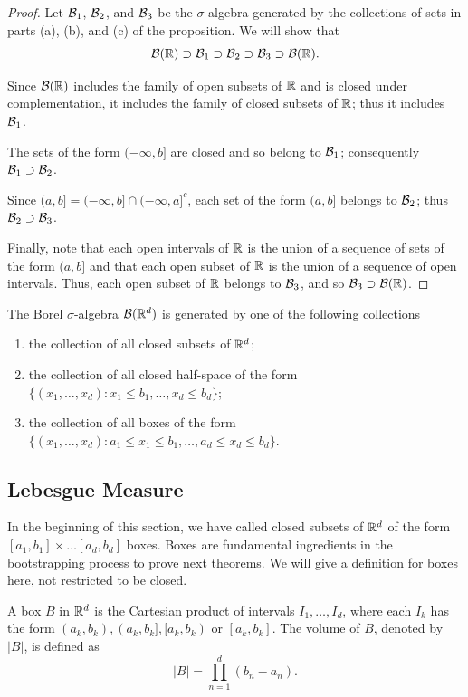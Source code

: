 \begin{proof}
  Let $\mathcal{B}_1$, $\mathcal{B}_2$, and $\mathcal{B}_3$ be the $\sigma$-algebra generated by the collections of sets in parts (a), (b), and (c) of the proposition. We will show that
  $$\mathcal{B}(\mathbb{R})\supset \mathcal{B}_1 \supset \mathcal{B}_2 \supset \mathcal{B}_3 \supset \mathcal{B}(\mathbb{R}).$$

  Since $\mathcal{B}(\mathbb{R})$ includes the family of open subsets of $\mathbb{R}$ and is closed under complementation, it includes the family of closed subsets of $\mathbb{R}$; thus it includes $\mathcal{B}_1$.

  The sets of the form $(-\infty,b]$ are closed and so belong to $\mathcal{B}_1$; consequently $\mathcal{B}_1 \supset \mathcal{B}_2$.

  Since $(a,b]=(-\infty,b]\cap(-\infty,a]^c$, each set of the form
  $(a,b]$ belongs to $\mathcal{B}_2$; thus $\mathcal{B}_2 \supset \mathcal{B}_3$.

  Finally, note that each open intervals of $\mathbb{R}$ is the union of a sequence of sets of the form $(a,b]$ and that each open subset of $\mathbb{R}$ is the union of a sequence of open intervals. Thus, each open subset of $\mathbb{R}$ belongs to $\mathcal{B}_3$, and so $\mathcal{B}_3 \supset \mathcal{B}(\mathbb{R})$.
\end{proof}

\begin{proposition}
  The Borel $\sigma$-algebra $\mathcal{B}(\mathbb{R}^d)$ is generated by one of the following collections
  \begin{enumerate}[label=(\alph*)]
    \item the collection of all closed subsets of $\mathbb{R}^d$;
    \item the collection of all closed half-space of the form $\{(x_1,\ldots,x_d): x_1\le b_1,\ldots, x_d\le b_d\}$;
    \item the collection of all boxes of the form $\{(x_1,\ldots,x_d): a_1\le x_1\le b_1,\ldots,a_d\le x_d\le b_d\}$.
  \end{enumerate}
\end{proposition}

\subsection{Lebesgue Measure}

In the beginning of this section, we have called closed subsets of $\mathbb{R}^d$ of the form $[a_1,b_1]\times\ldots[a_d, b_d]$ boxes. Boxes are fundamental ingredients in the bootstrapping process to prove next theorems. We will give a definition for boxes here, not restricted to be closed.

\begin{definition}
  A box $B$ in $\mathbb{R}^d$ is the Cartesian product of intervals $I_1,\ldots,I_d$, where each $I_k$ has the form $(a_k,b_k),(a_k,b_k], [a_k,b_k)$ or $[a_k, b_k]$. The volume of $B$, denoted by $|B|$, is defined as
  \begin{equation}
    |B| = \prod\limits_{n=1}^d (b_n-a_n).
  \end{equation}
\end{definition}

